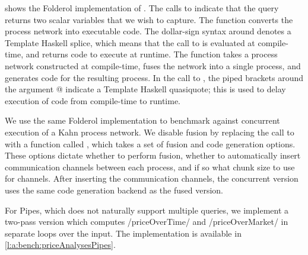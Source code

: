 
 shows the Folderol implementation of \Hs@priceAnalyses@.
The calls to \Hs@scalarIO@ indicate that the query returns two scalar variables that we wish to capture.
The \Hs@fuse@ function converts the process network into executable code.
The dollar-sign syntax around \Hs@fuse@ denotes a Template Haskell splice, which means that the call to \Hs@fuse@ is evaluated at compile-time, and returns code to execute at runtime.
The \Hs@fuse@ function takes a process network constructed at compile-time, fuses the network into a single process, and generates code for the resulting process.
In the call to \Hs@source@, the piped brackets around the argument @ indicate a Template Haskell quasiquote; this is used to delay execution of code from compile-time to runtime.

We use the same Folderol implementation to benchmark against concurrent execution of a Kahn process network.
We disable fusion by replacing the call to \Hs@fuse@ with a function called \Hs@fuseWith@, which takes a set of fusion and code generation options.
These options dictate whether to perform fusion, whether to automatically insert communication channels between each process, and if so what chunk size to use for channels.
After inserting the communication channels, the concurrent version uses the same code generation backend as the fused version.

For Pipes, which does not naturally support multiple queries, we implement a two-pass version which computes \Hs/priceOverTime/ and \Hs/priceOverMarket/ in separate loops over the input.
The implementation is available in \cref{l:a:bench:priceAnalysesPipes}.

